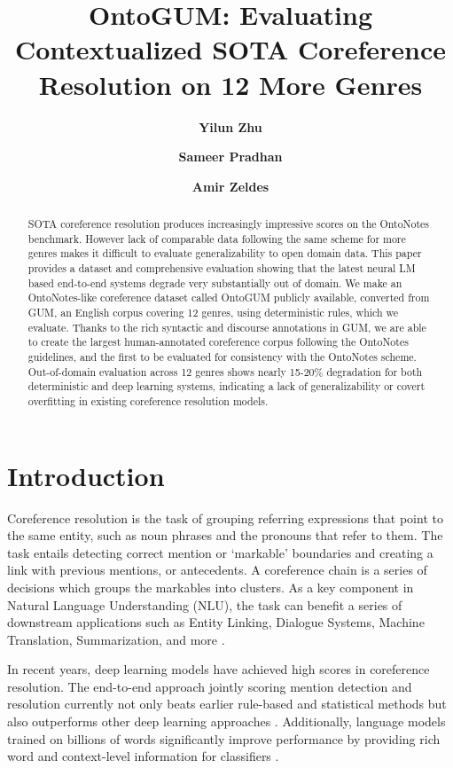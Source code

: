 \documentclass[11pt,a4paper]{article}
\title{OntoGUM: Evaluating Contextualized SOTA Coreference Resolution on 12 More Genres}
\author[1]{\textbf{Yilun Zhu}}
\author[2,3]{\textbf{Sameer Pradhan}}
\author[1]{\textbf{Amir Zeldes}}
\affil[1]{Department of Linguistics, Georgetown University}
\affil[2]{Linguistic Data Consortium, University of Pennsylvania}
\affil[3]{cemantix.org}
\affil[ ]{\tt \email{yz565@georgetown.edu, pradhan@cemantix.org, Amir.Zeldes@georgetown.edu}}
\date{}
\begin{document}
\maketitle

\begin{abstract}
SOTA coreference resolution produces increasingly impressive scores on the OntoNotes benchmark. However lack of comparable data following the same scheme for more genres makes it difficult to evaluate generalizability to open domain data. 
This paper provides a dataset and comprehensive evaluation showing that the latest neural LM based end-to-end systems degrade very substantially out of domain.
We make an OntoNotes-like coreference dataset called OntoGUM publicly available, converted from GUM, an English corpus covering 12 genres, using deterministic rules, which we evaluate. Thanks to the rich syntactic and discourse annotations in GUM, we are able to create the largest human-annotated coreference corpus following the OntoNotes guidelines, and the first to be evaluated for consistency with the OntoNotes scheme. Out-of-domain evaluation across 12 genres shows nearly 15-20\% degradation for both deterministic and deep learning systems, indicating a lack of generalizability or covert overfitting in existing coreference resolution models. 



\end{abstract}


\section{Introduction}
Coreference resolution is the task of grouping referring expressions that point to the same entity, such as noun phrases and the pronouns that refer to them. The task entails detecting correct mention or `markable' boundaries and creating a link with previous mentions, or antecedents. A coreference chain is a series of decisions which groups the markables into clusters. As a key component in Natural Language Understanding (NLU), the task can benefit a series of downstream applications such as Entity Linking, Dialogue Systems, Machine Translation, Summarization, and more \cite{poesio2016anaphora}.


In recent years, deep learning models have achieved high scores in coreference resolution. The end-to-end approach \cite{lee-etal-2017-end, lee-etal-2018-higher} jointly scoring mention detection and resolution currently not only beats earlier rule-based and statistical methods but also outperforms other deep learning approaches \cite{wiseman-etal-2016-learning, clark-manning-2016-deep, clark-manning-2016-improving}. Additionally, language models trained on billions of words significantly improve performance by providing rich word and context-level information for classifiers \citep{lee-etal-2018-higher, DBLP:journals/corr/abs-1907-10529, Joshi2019BERTFC}. 
\end{document}
